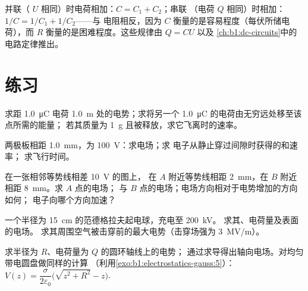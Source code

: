 \begin{remark}[电容器的组合]\label{rem:b1:potential-capacitors:association}
并联（ $U$ 相同）时电荷相加：$C = C_1 + C_2$；串联
（电荷 $Q$ 相同）时相加：$1/C = 1/C_1 + 1/C_2$——与
电阻相反，因为 $C$ 衡量的是容易程度（每伏所储电荷），而 $R$
衡量的是困难程度。这些规律由 $Q = CU$ 以及
\cref{ch:b1:dc-circuits}中的电路定律推出。
\end{remark}

\section{练习}

\begin{exercise}[$\star$]\label{exo:b1:potential-capacitors:1}
求距 \qty{1.0}{\micro C} 电荷 \qty{1.0}{m} 处的电势；求将另一个
\qty{1.0}{\micro C} 的电荷由无穷远处移至该点所需的能量；
若其质量为 \qty{1}{g} 且被释放，求它飞离时的速率。
\end{exercise}

\begin{exercise}[$\star$]\label{exo:b1:potential-capacitors:2}
两极板相距 \qty{1.0}{mm}，为 \qty{100}{V}：求电场；求
电子从静止穿过间隙时获得的和速率；
求飞行时间。
\end{exercise}

\begin{exercise}[$\star$]\label{exo:b1:potential-capacitors:3}
在一张相邻等势线相差 \qty{10}{V} 的图上，
在 $A$ 附近等势线相距 \qty{2}{mm}，在 $B$ 附近相距 \qty{8}{mm}。求 $A$ 点的电场；
与 $B$ 点的电场；电场方向相对于电势增加的方向如何；
电子向哪个方向加速？
\end{exercise}

\begin{exercise}[$\star$]\label{exo:b1:potential-capacitors:4}
一个半径为 \qty{15}{cm} 的范德格拉夫起电球，充电至 \qty{200}{kV}。
求其、电荷量及表面的电场。
求其周围空气被击穿前的最大电势（击穿场强为 \qty{3}{MV/m}）。
\end{exercise}

\begin{exercise}[$\star\star$]\label{exo:b1:potential-capacitors:5}
求半径为 $R$、电荷量为 $Q$ 的圆环轴线上的电势；
通过求导得出轴向电场。对均匀带电圆盘做同样的计算
（利用\cref{exo:b1:electrostatics-gauss:5}）：$V(z) = \dfrac{\sigma}{2\varepsilon_0}
\bigl(\sqrt{z^2 + R^2} - z\bigr)$.
\end{exercise}

